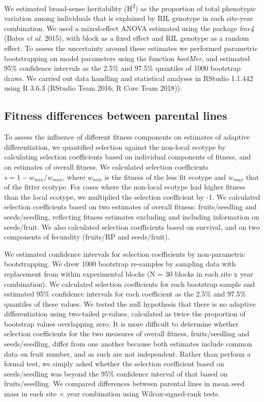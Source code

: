 \documentclass[]{article}
\begin{document}
We estimated broad-sense heritability (H\textsuperscript{2}) as the proportion of total phenotypic variation among individuals that is explained by RIL genotype in each site-year combination. We used a mixed-effect ANOVA estimated using the package \emph{lme4} (Bates \emph{et al.} 2015), with block as a fixed effect and RIL genotype as a random effect. To assess the uncertainty around these estimates we performed parametric bootstrapping on model parameters using the function \emph{bootMer}, and estimated 95\% confidence intervals as the 2.5\% and 97.5\% quantiles of 1000 bootstrap draws. We carried out data handling and statistical analyses in RStudio 1.1.442 using R 3.6.3 (RStudio Team 2016; R Core Team 2018)).

\hypertarget{fitness-differences-between-parental-lines}{%
\subsection{Fitness differences between parental lines}\label{fitness-differences-between-parental-lines}}

To assess the influence of different fitness components on estimates of adaptive differentiation, we quantified selection against the non-local ecotype by calculating selection coefficients based on individual components of fitness, and on estimates of overall fitness. We calculated selection coefficients \(s=1-w_{min}/w_{max}\), where \(w_{min}\) is the fitness of the less fit ecotype and \(w_{max}\) that of the fitter ecotype. For cases where the non-local ecotype had higher fitness than the local ecotype, we multiplied the selection coefficient by -1. We calculated selection coefficients based on two estimates of overall fitness: fruits/seedling and seeds/seedling, reflecting fitness estimates excluding and including information on seeds/fruit. We also calculated selection coefficients based on survival, and on two components of fecundity (fruits/RP and seeds/fruit).

We estimated confidence intervals for selection coefficients by non-parametric bootstrapping. We drew 1000 bootstrap re-samples by sampling data with replacement from within experimental blocks (N = 30 blocks in each site x year combination). We calculated selection coefficients for each bootstrap sample and estimated 95\% confidence intervals for each coefficient as the 2.5\% and 97.5\% quantiles of these values. We tested the null hypothesis that there is no adaptive differentiation using two-tailed p-values, calculated as twice the proportion of bootstrap values overlapping zero. It is more difficult to determine whether selection coefficients for the two measures of overall fitness, fruits/seedling and seeds/seedling, differ from one another because both estimates include common data on fruit number, and as such are not independent. Rather than perform a formal test, we simply asked whether the selection coefficient based on seeds/seedling was beyond the 95\% confidence interval of that based on fruits/seedling. We compared differences between parental lines in mean seed mass in each site × year combination using Wilcox-signed-rank tests.
\end{document}

